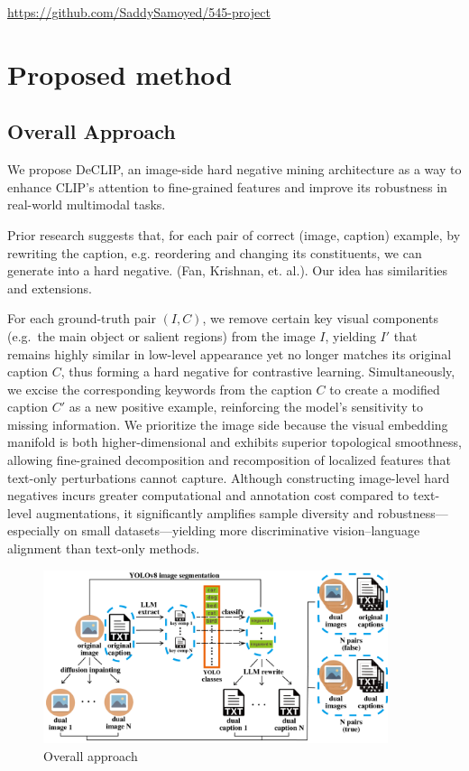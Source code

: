 \documentclass[11pt,letterpaper]{article}
\begin{document}
\vfill
\noindent\tiny\url{https://github.com/SaddySamoyed/545-project}
\normalsize

\FloatBarrier 

\section{Proposed method}
\subsection{Overall Approach}
We propose DeCLIP, an image-side hard negative mining architecture as a way to enhance CLIP’s attention to fine-grained features and improve its robustness in real-world multimodal tasks. 

Prior research suggests that, for each pair of correct (image, caption) example, by rewriting the caption, e.g. reordering and changing its constituents, we can generate into a hard negative. (Fan, Krishnan, et. al.\cite{fan2023improvingcliptraininglanguage}). Our idea has similarities and extensions. 

For each ground-truth pair \((I, C)\), we remove certain key visual components (e.g.\ the main object or salient regions) from the image \(I\), yielding \(I'\) that remains highly similar in low-level appearance yet no longer matches its original caption \(C\), thus forming a hard negative for contrastive learning. Simultaneously, we excise the corresponding keywords from the caption \(C\) to create a modified caption \(C'\) as a new positive example, reinforcing the model’s sensitivity to missing information. We prioritize the image side because the visual embedding manifold is both higher-dimensional and exhibits superior topological smoothness, allowing fine-grained decomposition and recomposition of localized features that text-only perturbations cannot capture. Although constructing image-level hard negatives incurs greater computational and annotation cost compared to text-level augmentations, it significantly amplifies sample diversity and robustness—especially on small datasets—yielding more discriminative vision–language alignment than text-only methods.


\begin{figure}{}
    \centering
    \includegraphics[width=0.9\textwidth]{final_report/assets/overall_method.png}
    \caption{Overall approach}
\end{figure}
\end{document}
